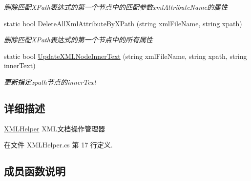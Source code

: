 \begin{DoxyCompactItemize}
\begin{DoxyCompactList}\small\item\em 删除匹配\+X\+Path表达式的第一个节点中的匹配参数xml\+Attribute\+Name的属性 \end{DoxyCompactList}\item 
static bool \hyperlink{class_x_c_l_net_tools_1_1_x_m_l_1_1_x_m_l_helper_a07059a8c89a84c359cc9893c842a263e}{Delete\+All\+Xml\+Attribute\+By\+X\+Path} (string xml\+File\+Name, string xpath)
\begin{DoxyCompactList}\small\item\em 删除匹配\+X\+Path表达式的第一个节点中的所有属性 \end{DoxyCompactList}\item 
static bool \hyperlink{class_x_c_l_net_tools_1_1_x_m_l_1_1_x_m_l_helper_a680dbf5fec70c3e5e30d0f75fedc2d3c}{Update\+X\+M\+L\+Node\+Inner\+Text} (string xml\+File\+Name, string xpath, string inner\+Text)
\begin{DoxyCompactList}\small\item\em 更新指定xpath节点的inner\+Text \end{DoxyCompactList}\end{DoxyCompactItemize}


\subsection{详细描述}
\hyperlink{class_x_c_l_net_tools_1_1_x_m_l_1_1_x_m_l_helper}{X\+M\+L\+Helper} X\+M\+L文档操作管理器 



在文件 X\+M\+L\+Helper.\+cs 第 17 行定义.



\subsection{成员函数说明}
\mbox{\label{class_x_c_l_net_tools_1_1_x_m_l_1_1_x_m_l_helper_af784efe901d3b7ee6d6ffbcb2711f489}} 
